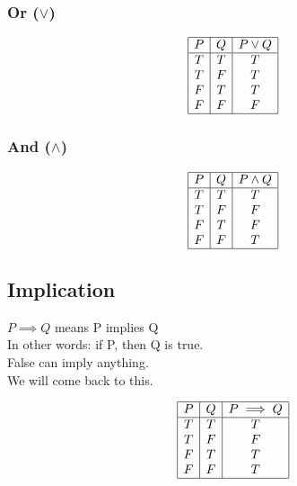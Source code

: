 \documentclass[a4paper]{article}
\begin{document}
\subsubsection{Or ($\lor$)}
\begin{center}
	\begin{displaymath}
		\begin{array}{|c|c|c|}
			\hline
			P & Q & P \lor Q \\ 
			\hline
			T & T & T\\
			T & F & T\\
			F & T & T\\
			F & F & F\\ 
			\hline
		\end{array}
	\end{displaymath}
\end{center}

\subsubsection{And ($\land$)}
\begin{center}
	\begin{displaymath}
		\begin{array}{|c|c|c|}
			\hline
			P & Q & P \land Q \\ 
			\hline
			T & T & T\\
			T & F & F\\
			F & T & F\\
			F & F & T\\ 
			\hline
		\end{array}
	\end{displaymath}
\end{center}

\subsection{Implication}
$P \implies Q$ means P implies Q 
\\
In other words: if P, then Q is true.
\\
False can imply anything.
\\
We will come back to this.
\begin{center}
	\begin{displaymath}
		\begin{array}{|c|c|c|}
			\hline
			P & Q & P \implies Q \\ 
			\hline
			T & T & T\\
			T & F & F\\
			F & T & T\\
			F & F & T\\
			\hline
		\end{array}
	\end{displaymath}
\end{center}
\end{document}
